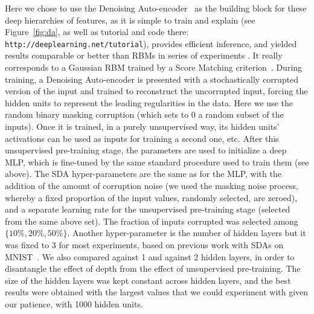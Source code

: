 \documentclass{article} %
\begin{document}
Here we chose to use the Denoising
Auto-encoder~\citep{VincentPLarochelleH2008-very-small} as the building block for
these deep hierarchies of features, as it is simple to train and
explain (see Figure~\ref{fig:da}, as well as 
tutorial and code there: {\tt http://deeplearning.net/tutorial}), 
provides efficient inference, and yielded results
comparable or better than RBMs in series of experiments
\citep{VincentPLarochelleH2008-very-small}. It really corresponds to a Gaussian
RBM trained by a Score Matching criterion~\cite{Vincent-SM-2010}.
During training, a Denoising
Auto-encoder is presented with a stochastically corrupted version
of the input and trained to reconstruct the uncorrupted input,
forcing the hidden units to represent the leading regularities in
the data. Here we use the random binary masking corruption
(which sets to 0 a random subset of the inputs).
 Once it is trained, in a purely unsupervised way, 
its hidden units' activations can
be used as inputs for training a second one, etc.
After this unsupervised pre-training stage, the parameters
are used to initialize a deep MLP, which is fine-tuned by
the same standard procedure used to train them (see above).
The SDA hyper-parameters are the same as for the MLP, with the addition of the
amount of corruption noise (we used the masking noise process, whereby a
fixed proportion of the input values, randomly selected, are zeroed), and a
separate learning rate for the unsupervised pre-training stage (selected
from the same above set). The fraction of inputs corrupted was selected
among $\{10\%, 20\%, 50\%\}$. Another hyper-parameter is the number
of hidden layers but it was fixed to 3 for most experiments,
based on previous work with
SDAs on MNIST~\citep{VincentPLarochelleH2008-very-small}. 
We also compared against 1 and against 2 hidden layers, in order
to disantangle the effect of depth from the effect of unsupervised
pre-training.
The size of the hidden
layers was kept constant across hidden layers, and the best results
were obtained with the largest values that we could experiment
with given our patience, with 1000 hidden units.

\end{document}
